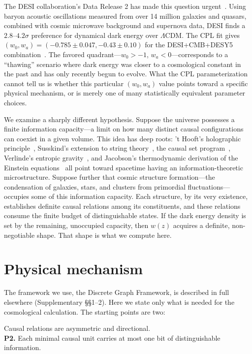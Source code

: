 \documentclass[12pt,a4paper]{article}
\begin{document}
The DESI collaboration's Data Release 2 has made this question urgent~\cite{desi2025}. Using baryon acoustic oscillations measured from over 14 million galaxies and quasars, combined with cosmic microwave background and supernova data, DESI finds a $2.8$--$4.2\sigma$ preference for dynamical dark energy over $\Lambda$CDM. The CPL fit gives $(w_0,w_a)=(-0.785\pm0.047,-0.43\pm0.10)$ for the DESI+CMB+DESY5 combination~\cite{li2026}. The favored quadrant---$w_0>-1$, $w_a<0$---corresponds to a ``thawing'' scenario where dark energy was closer to a cosmological constant in the past and has only recently begun to evolve. What the CPL parameterization cannot tell us is whether this particular $(w_0,w_a)$ value points toward a specific physical mechanism, or is merely one of many statistically equivalent parameter choices.

We examine a sharply different hypothesis. Suppose the universe possesses a finite information capacity---a limit on how many distinct causal configurations can coexist in a given volume. This idea has deep roots: 't Hooft's holographic principle~\cite{thooft1993}, Susskind's extension to string theory~\cite{susskind1995}, the causal set program~\cite{sorkin2005}, Verlinde's entropic gravity~\cite{verlinde2011}, and Jacobson's thermodynamic derivation of the Einstein equations~\cite{jacobson1995} all point toward spacetime having an information-theoretic microstructure. Suppose further that cosmic structure formation---the condensation of galaxies, stars, and clusters from primordial fluctuations---occupies some of this information capacity. Each structure, by its very existence, establishes definite causal relations among its constituents, and these relations consume the finite budget of distinguishable states. If the dark energy density is set by the remaining, unoccupied capacity, then $w(z)$ acquires a definite, non-negotiable shape. That shape is what we compute here.

\section*{Physical mechanism}

The framework we use, the Discrete Graph Framework, is described in full elsewhere (Supplementary \S\S1--2). Here we state only what is needed for the cosmological calculation. The starting points are two:

\vspace{4pt}
 Causal relations are asymmetric and directional.\\
{\bf P2.} Each minimal causal unit carries at most one bit of distinguishable information.
\end{document}
